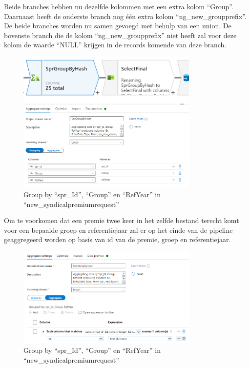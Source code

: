 Beide branches hebben nu dezelfde kolommen met een extra kolom ``Group''. Daarnaast heeft de onderste branch nog één extra kolom ``ng\_new\_groupprefix''. De beide branches worden nu samen gevoegd met behulp van een union. De bovenste branch die de kolom ``ng\_new\_groupprefix'' niet heeft zal voor deze kolom de waarde ``NULL'' krijgen in de records komende van deze branch. 

\begin{figure}[H]
    \centering
    \includegraphics[width=0.8\textwidth]{./graphics/adf/group_by_1.png}
    \caption{Group by ``spr\_Id'', ``Group'' en ``RefYear'' in ``new\_syndicalpremiumrequest''}
    \label{fig:groupby}
\end{figure}

Om te voorkomen dat een premie twee keer in het zelfde bestand terecht komt voor een bepaalde groep en referentiejaar zal er op het einde van de pipeline geaggregeerd worden op basis van id van de premie, groep en referentiejaar.

\begin{figure}[H]
    \centering
    \includegraphics[width=0.8\textwidth]{./graphics/adf/group_by_2.png}
    \caption{Group by ``spr\_Id'', ``Group'' en ``RefYear'' in ``new\_syndicalpremiumrequest''}
\end{figure}

